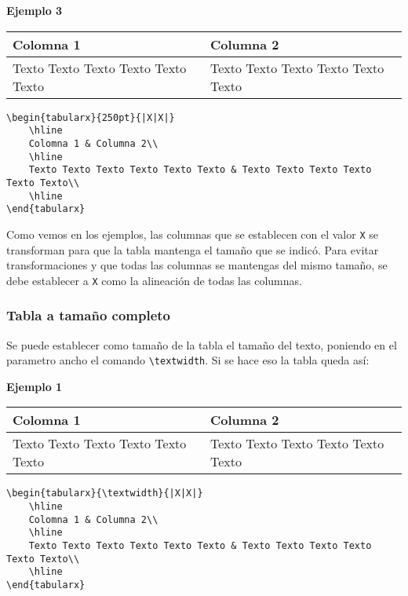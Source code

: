 	\textbf{Ejemplo 3}
	
	\begin{center}
		\begin{tabularx}{250pt}{|X|X|}
			\hline
			Colomna 1 & Columna 2\\
			\hline		
			Texto Texto Texto Texto Texto Texto & Texto Texto Texto Texto Texto Texto\\
			\hline	
		\end{tabularx}
	\end{center}
	
	\begin{myquote}
		\begin{lstlisting}
\begin{tabularx}{250pt}{|X|X|}
	\hline
	Colomna 1 & Columna 2\\
	\hline		
	Texto Texto Texto Texto Texto Texto & Texto Texto Texto Texto Texto Texto\\
	\hline	
\end{tabularx}			
		\end{lstlisting}
	\end{myquote}
	
	Como vemos en los ejemplos, las columnas que se establecen con el valor \verb|X| se transforman para que la tabla mantenga el tamaño que se indicó. Para evitar transformaciones y que todas las columnas se mantengas del mismo tamaño, se debe establecer a \verb|X| como la alineación de todas las columnas.
	
	\subsubsection{Tabla a tamaño completo}
	
	Se puede establecer como tamaño de la tabla el tamaño del texto, poniendo en el parametro ancho el comando \verb|\textwidth|. Si se hace eso la tabla queda así:
	
	\textbf{Ejemplo 1}
	
	\begin{center}		
		\begin{tabularx}{\textwidth}{|X|X|}
			\hline
			Colomna 1 & Columna 2\\
			\hline		
			Texto Texto Texto Texto Texto Texto & Texto Texto Texto Texto Texto Texto\\
			\hline	
		\end{tabularx}
	\end{center}	
	
	\begin{myquote}
		\begin{lstlisting}
\begin{tabularx}{\textwidth}{|X|X|}
	\hline
	Colomna 1 & Columna 2\\
	\hline		
	Texto Texto Texto Texto Texto Texto & Texto Texto Texto Texto Texto Texto\\
	\hline	
\end{tabularx}			
		\end{lstlisting}
	\end{myquote}
	
